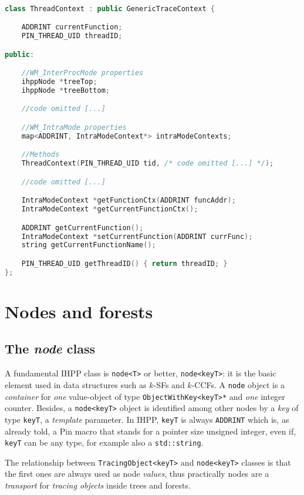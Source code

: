 \documentclass[a4paper,10pt]{report}
\begin{document}
\begin{lstlisting}[language=C++,
	caption={partial definition of \texttt{ThreadContext} class},
	label=threadCtx, frame=leftline]

class ThreadContext : public GenericTraceContext {

	ADDRINT currentFunction;
	PIN_THREAD_UID threadID;

public:

	//WM_InterProcMode properties
	ihppNode *treeTop;
	ihppNode *treeBottom;

	//code omitted [...]

	//WM_IntraMode properties
	map<ADDRINT, IntraModeContext*> intraModeContexts;

	//Methods
	ThreadContext(PIN_THREAD_UID tid, /* code omitted [...] */);

	//code omitted [...]

	IntraModeContext *getFunctionCtx(ADDRINT funcAddr);
	IntraModeContext *getCurrentFunctionCtx();

	ADDRINT getCurrentFunction();
	IntraModeContext *setCurrentFunction(ADDRINT currFunc);
	string getCurrentFunctionName();

	PIN_THREAD_UID getThreadID() { return threadID; }
};

\end{lstlisting}

\section{Nodes and forests}

\subsection{The \emph{node} class}

A fundamental IHPP class is \verb|node<T>| or better, \verb|node<keyT>|:
it is the basic element used in data structures such as $k$-SFs and $k$-CCFs.
A \verb|node| object is a \emph{container} for \emph{one}
value-object of type \verb|ObjectWithKey<keyT>*| and \emph{one} integer counter.
Besides, a \verb|node<keyT>| object is identified among other nodes by a
\emph{key} of type \verb|keyT|, a \emph{template} parameter.
In IHPP, \verb|keyT| is always \verb|ADDRINT| which is, as already told, a Pin macro
that stands for a pointer size unsigned integer, even if, \verb|keyT| can be
any type, for example also a \verb|std::string|.

The relationship between \verb|TracingObject<keyT>| and \verb|node<keyT>| classes is
that the first ones are always used as node \emph{values}, thus practically
nodes are a \emph{transport} for \emph{tracing objects} inside trees and forests.
\end{document}
